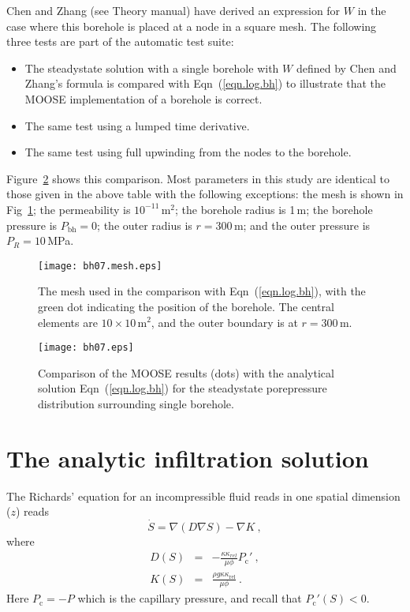 \documentclass[]{scrreprt}
\begin{document}
Chen and Zhang (see Theory manual) have derived an expression for $W$
in the case where this borehole is placed at a node in a square mesh.
The following three tests are part of the automatic test suite:
\begin{itemize}
\item The steadystate solution with a single borehole with $W$ defined by
Chen and Zhang's formula is compared with Eqn~(\ref{eqn.log.bh}) to
illustrate that the MOOSE implementation of a borehole is correct.
\item The same test using a lumped time derivative.
\item The same test using full upwinding from the nodes to the borehole.
\end{itemize}
Figure~\ref{bh07.fig} shows this comparison.  Most parameters in this
study are identical to those given in the above table with the
following exceptions: the mesh is shown in Fig~\ref{bh07.mesh.fig};
the permeability is $10^{-11}$\,m$^{2}$; the borehole radius is 1\,m;
the borehole pressure is $P_{\mathrm{bh}}=0$; the outer radius is
$r=300$\,m; and the outer pressure is $P_{R}=10$\,MPa.

\begin{figure}[htb]
\centering
\texttt{[image: bh07.mesh.eps]}
\caption{The mesh used in the comparison with Eqn~(\ref{eqn.log.bh}),
  with the green dot indicating the position of the borehole.
  The central elements are $10\times 10$\,m$^{2}$, and the outer
  boundary is at $r=300$\,m.}
\label{bh07.mesh.fig}
\end{figure}



\begin{figure}[htb]
\centering
\texttt{[image: bh07.eps]}
\caption{Comparison of the MOOSE results (dots) with the analytical
  solution Eqn~(\ref{eqn.log.bh}) for the steadystate porepressure
  distribution surrounding single borehole.}
\label{bh07.fig}
\end{figure}





\chapter{The analytic infiltration solution}
\label{bw}

The Richards' equation for an incompressible fluid reads in one
spatial dimension ($z$) reads
\begin{equation}
\dot{S} = \nabla \left(D \nabla S\right) - \nabla K \ ,
\end{equation}
where
\begin{eqnarray}
D(S) & = & -\frac{\kappa \kappa_{rel}}{\mu\phi}P_{\mathrm{c}}' \ ,
\\
K(S) & = &\frac{\rho g \kappa\kappa_{\mathrm{rel}}}{\mu\phi} \ .
\end{eqnarray}
Here $P_{\mathrm{c}} = -P$ which is the capillary pressure, and recall
that $P_{\mathrm{c}}'(S)<0$.
\end{document}

